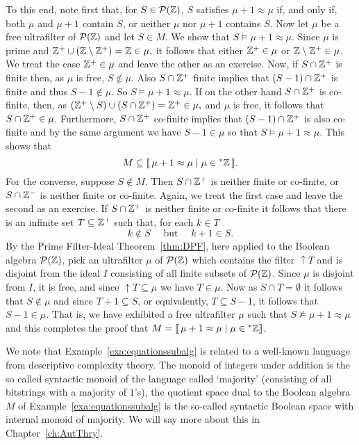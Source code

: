 \begin{example}
To this end, note first that, for $S \in \mathcal{P}(\mathbb{Z})$, $S$ satisfies $\mu+1 \approx \mu$ if, and only if, both $\mu$ and $\mu + 1$ contain $S$, or neither $\mu$ nor $\mu + 1$ contains $S$.
Now let $\mu$ be a free ultrafilter of $\mathcal{P}(\mathbb{Z})$ and let $S\in M$. We show that $S\models \mu+1\approx\mu$. Since $\mu$ is prime and $\mathbb{Z}^+\cup (\mathbb{Z} \setminus \mathbb{Z}^+)=\mathbb{Z}\in\mu,$ it follows that either $\mathbb{Z}^+\in\mu$ or $\mathbb{Z} \setminus \mathbb{Z}^+ \in\mu$. We treat the case $\mathbb{Z}^+\in\mu$ and leave the other as an exercise. Now, if $S\cap\mathbb{Z}^+$ is finite then, as $\mu$ is free, $S\not\in\mu$. Also $S\cap\mathbb{Z}^+$ finite implies that $(S-1)\cap\mathbb{Z}^+$ is finite and thus $S-1\not\in\mu$. So $S\models \mu+1\approx\mu$. If on the other hand $S\cap\mathbb{Z}^+$ is co-finite, then, as 
$
(\mathbb{Z}^+\setminus S) \cup (S\cap\mathbb{Z}^+)=\mathbb{Z}^+\in\mu, 
$
and $\mu$ is free, it follows that $S\cap\mathbb{Z}^+\in\mu$. Furthermore, $S\cap\mathbb{Z}^+$ co-finite implies that $(S-1)\cap\mathbb{Z}^+$ is also co-finite and by the same argument we have $S-1\in\mu$ so that $S\models \mu+1\approx\mu$. This shows that
\[
M\subseteq\llbracket {\,\mu+1\approx\mu\mid \mu\in{}^*\mathbb{Z}\,} \rrbracket.
\]
For the converse, suppose $S\not\in M$. Then $S\cap\mathbb{Z}^+$ is neither finite or co-finite, or $S\cap\mathbb{Z}^-$ is neither finite or co-finite. Again, we treat the first case and leave the second as an exercise. If $S\cap\mathbb{Z}^+$ is neither finite or co-finite it follows that there is an infinite set $T\subseteq\mathbb{Z}^+$ such that, for each $k\in T$
\[
k\not\in S \quad\text{ but }\quad k+1\in S.
\]
By the Prime Filter-Ideal Theorem~\ref{thm:DPF}, here applied to the Boolean algebra $\mathcal{P}(\mathbb{Z})$, pick an ultrafilter  $\mu$ of $\mathcal{P}(\mathbb{Z})$ which contains the filter ${\uparrow}T$ and is disjoint from the ideal $I$ consisting of all finite subsets of $\mathcal{P}(\mathbb{Z})$. Since $\mu$ is disjoint from $I$, it is free, and since ${\uparrow}T\subseteq\mu$ we have $T\in\mu$. Now as $S\cap T=\emptyset$ it follows that $S\not\in\mu$ and since $T+1\subseteq S$, or equivalently, $T\subseteq S-1$, it follows that $S-1\in\mu$. That is, we have exhibited a free ultrafilter $\mu$ such that  $S\not\models \mu+1\approx\mu$ and this completes the proof that $M=\llbracket {\,\mu+1\approx\mu\mid \mu\in{}^*\mathbb{Z}} \rrbracket$. 
\end{example}

We note that Example~\ref{exa:equationssubalg} is related to a well-known language from descriptive complexity theory. The monoid of integers under addition is the so called syntactic monoid of the language called `majority' (consisting of all bitstrings with a majority of $1$'s), the quotient space dual to the Boolean algebra $M$ of Example~\ref{exa:equationssubalg} is the so-called syntactic Boolean space with internal monoid of majority. %
We will say more about this %
in Chapter~\ref{ch:AutThry}.

